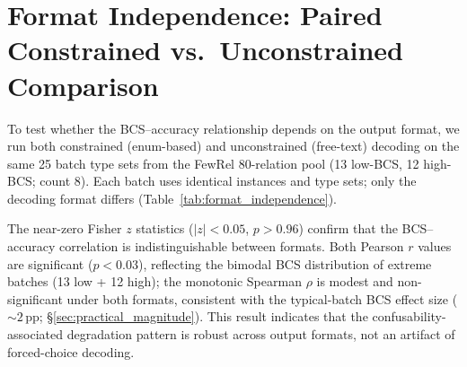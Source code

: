 \documentclass[11pt]{article}
\begin{document}
\section{Format Independence: Paired Constrained vs.\ Unconstrained Comparison}
\label{app:format-independence}

To test whether the BCS--accuracy relationship depends on the output format, we run both constrained (enum-based) and unconstrained (free-text) decoding on the same 25 batch type sets from the FewRel 80-relation pool (13 low-BCS, 12 high-BCS; count 8). Each batch uses identical instances and type sets; only the decoding format differs (Table~\ref{tab:format_independence}).

\begin{table}[h]
\centering
\small
\caption{Paired comparison of constrained vs.\ unconstrained decoding on 25 identical FewRel batch type sets. Both formats yield virtually identical BCS--accuracy correlations (Fisher $z \approx 0$), confirming the confusability effect is not format-dependent. Mean accuracy is also unchanged ($\Delta = -0.08$\,pp), ruling out a format-driven accuracy shift.}
\label{tab:format_independence}
\end{table}

The near-zero Fisher $z$ statistics ($|z| < 0.05$, $p > 0.96$) confirm that the BCS--accuracy correlation is indistinguishable between formats. Both Pearson $r$ values are significant ($p < 0.03$), reflecting the bimodal BCS distribution of extreme batches (13 low + 12 high); the monotonic Spearman $\rho$ is modest and non-significant under both formats, consistent with the typical-batch BCS effect size (${\sim}2$\,pp; \S\ref{sec:practical_magnitude}). This result indicates that the confusability-associated degradation pattern is robust across output formats, not an artifact of forced-choice decoding.
\end{document}
